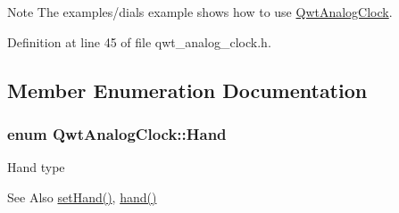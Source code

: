 \begin{DoxyNote}{Note}
The examples/dials example shows how to use \hyperlink{class_qwt_analog_clock}{Qwt\-Analog\-Clock}. 
\end{DoxyNote}


Definition at line 45 of file qwt\-\_\-analog\-\_\-clock.\-h.



\subsection{Member Enumeration Documentation}
\hypertarget{class_qwt_analog_clock_acd8f7e963ae073120684de46821f2cfe}{
\subsubsection[{Hand}]{\setlength{\rightskip}{0pt plus 5cm}enum {\bf Qwt\-Analog\-Clock\-::\-Hand}}}\label{class_qwt_analog_clock_acd8f7e963ae073120684de46821f2cfe}
Hand type \begin{DoxySeeAlso}{See Also}
\hyperlink{class_qwt_analog_clock_a643101aafbe7a6fc91cb550203a7d3ee}{set\-Hand()}, \hyperlink{class_qwt_analog_clock_ab390561b0856eef0d2bb80bdff0fb204}{hand()} 
\end{DoxySeeAlso}
